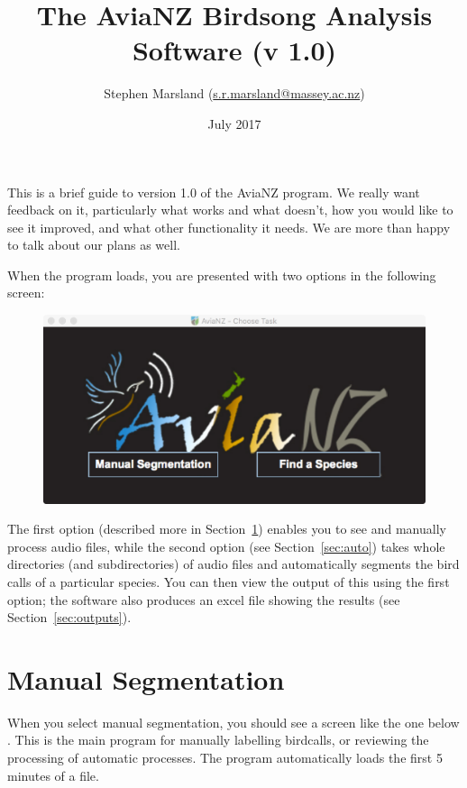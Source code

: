 \documentclass{article}
\title{The AviaNZ Birdsong Analysis Software (v 1.0)}
\author{Stephen Marsland (\url{s.r.marsland@massey.ac.nz})}
\date{July 2017}
\begin{document}
\maketitle


This is a brief guide to version 1.0 of the AviaNZ program. 
We really want feedback on it, particularly what works and what doesn't, how you would like to see it improved, and what other functionality it needs. We are more than happy to talk about our plans as well. 


When the program loads, you are presented with two options  in the following screen:

\begin{figure}[h!]
\centering
\includegraphics[width=.3\textwidth]{Figs/splashscreen}
\caption{}
\label{welcome}
\end{figure}

The first option (described more in Section~\ref{sec:manual}) enables you to see and manually process audio files, while the second option (see Section~\ref{sec:auto}) takes whole directories (and subdirectories) of audio files and automatically segments the bird calls of a particular species. You can then view the output of this using the first option; the software also produces an excel file showing the results (see Section~\ref{sec:outputs}).  

\section{Manual Segmentation}
\label{sec:manual}

When you select manual segmentation,  you should see a screen like the one below . This is the main program for manually labelling birdcalls, or reviewing the processing of automatic processes.
The program automatically loads the first 5 minutes of a file. 
\end{document}
